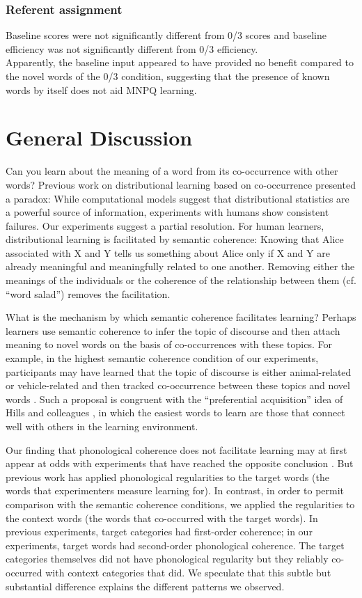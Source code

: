 \documentclass[man,floatsintext]{apa6}
\begin{document}
\subsubsection{Referent assignment}
Baseline scores were not significantly different from 0/3 scores and baseline efficiency was not significantly different from 0/3 efficiency.\\

Apparently, the baseline input appeared to have provided no benefit compared to the novel words of the 0/3 condition, suggesting that the presence of known words by itself does not aid MNPQ learning.

\section{General Discussion}
Can you learn about the meaning of a word from its co-occurrence with other words? Previous work on distributional learning based on co-occurrence presented a paradox: While computational models suggest that distributional statistics are a powerful source of information, experiments with humans show consistent failures. Our experiments suggest a partial resolution. For human learners, distributional learning is facilitated by semantic coherence: Knowing that Alice associated with X and Y tells us something about Alice only if X and Y are already meaningful and meaningfully related to one another. Removing either the meanings of the individuals or the coherence of the relationship between them (cf. ``word salad'') removes the facilitation. 

What is the mechanism by which semantic coherence facilitates learning? Perhaps learners use semantic coherence to infer the topic of discourse and then attach meaning to novel words on the basis of co-occurrences with these topics. For example, in the highest semantic coherence condition of our experiments, participants may have learned that the topic of discourse is either animal-related or vehicle-related and then tracked co-occurrence between these topics and novel words \citep{frank2013}. Such a proposal is congruent with the ``preferential acquisition'' idea of Hills and colleagues \citeyearpar{hills2009, hills2010}, in which the easiest words to learn are those that connect well with others in the learning environment. 

Our finding that phonological coherence does not facilitate learning may at first appear at odds with experiments that have reached the opposite conclusion \citep{frigo1998, lany2010, monaghan2005}. But previous work has applied phonological regularities to the target words (the words that experimenters measure learning for).  In contrast, in order to permit comparison with the semantic coherence conditions, we applied the regularities to the context words (the words that co-occurred with the target words). In previous experiments, target categories had first-order coherence; in our experiments, target words had second-order phonological coherence. The target categories themselves did not have phonological regularity but they reliably co-occurred with context categories that did. We speculate that this subtle but substantial difference explains the different patterns we observed.
\end{document}
